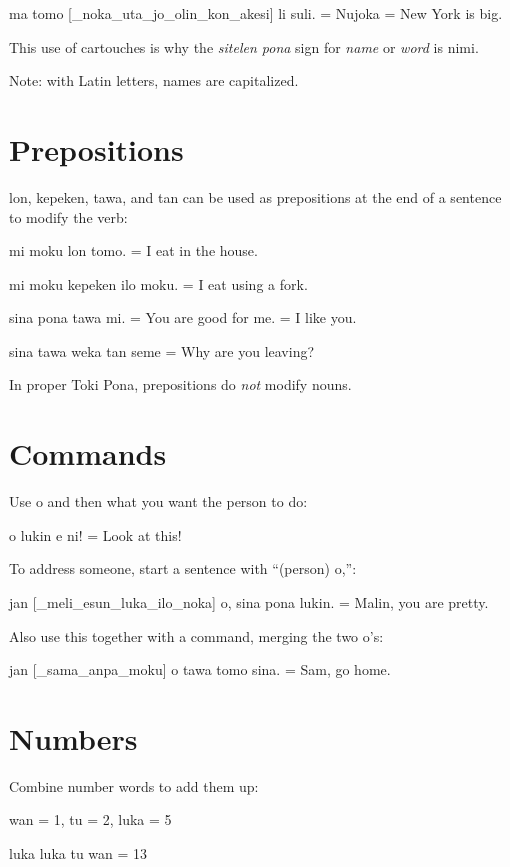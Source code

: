 \documentclass{article}
\begin{document}
\begin{multicols}{2}
\begin{ex}
  {\tpf ma tomo [\_noka\_uta\_jo\_olin\_kon\_akesi] li suli}.
  = Nujoka = New York is big.
\end{ex}

This use of cartouches is why the \textit{sitelen pona} sign for
\textit{name} or \textit{word} is {\tpf nimi}.

Note: with Latin letters, names are capitalized.

\section*{Prepositions}
{\tpf lon, kepeken, tawa}, and {\tpf tan}
can be used as prepositions at the end of a sentence
to modify the verb:
\begin{ex}
  {\tpf mi moku lon tomo.} = I eat in the house.

  {\tpf mi moku kepeken ilo moku.} = I eat using a fork.

  {\tpf sina pona tawa mi.} = You are good for me. = I like you.

  {\tpf sina tawa weka tan seme} = Why are you leaving?
\end{ex}

In proper Toki Pona, prepositions do \textit{not} modify nouns.

\section*{Commands}
Use {\tpf o} and then what you want the person to do:
\begin{ex}
  {\tpf o lukin e ni}! = Look at this!
\end{ex}

To address someone, start a sentence with “(person) {\tpf o},”:
\begin{ex}
  {\tpf jan [\_meli\_esun\_luka\_ilo\_noka] o, sina pona lukin.} = Malin, you are pretty.
\end{ex}

Also use this together with a command, merging the two
{\tpf o}’s:

\begin{ex}
  {\tpf jan [\_sama\_anpa\_moku] o tawa tomo sina.} = Sam, go home.
\end{ex}
\section*{Numbers}
Combine number words to add them up:
\begin{ex}
  {\tpf wan} = 1, {\tpf tu} = 2, {\tpf luka} = 5

  {\tpf luka luka tu wan} = 13
\end{ex}
\end{multicols} 
\end{document}
